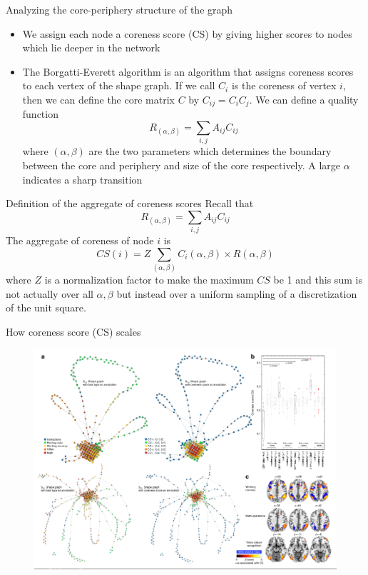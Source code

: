 \documentclass{beamer}
\begin{document}
\begin{frame}{Analyzing the core-periphery structure of the graph}
    \begin{itemize}
        \item We assign each node a coreness score (CS) by giving higher scores to nodes which lie deeper in the network
        \item The Borgatti-Everett algorithm is an algorithm that assigns coreness scores to each vertex of the shape graph. If we call $C_i$ is the coreness of vertex $i$, then we can define the core matrix $C$ by $C_{ij} = C_{i}C_j$. We can define a quality function \[R_{(\alpha,\beta)} = \sum_{i,j}A_{ij}C_{ij}\]where $(\alpha, \beta)$ are the two parameters which determines the boundary between the core and periphery and size of the core respectively. A large $\alpha$ indicates a sharp transition
    \end{itemize}
\end{frame}

\begin{frame}{Definition of the aggregate of coreness scores}
    Recall that 
    \[R_{(\alpha,\beta)} = \sum_{i,j}A_{ij}C_{ij}\]
    The aggregate of coreness of node $i$ is \[CS(i) = Z \sum_{(\alpha, \beta)} C_i(\alpha, \beta) \times R(\alpha, \beta)\]where $Z$ is a normalization factor to make the maximum $CS$ be 1 and this sum is not actually over all $\alpha,\beta$ but instead over a uniform sampling of a discretization of the unit square.
\end{frame}

\begin{frame}{How coreness score (CS) scales}
    \begin{figure}
        \includegraphics[width = 0.85\linewidth]{fig4.png}
    \end{figure}
\end{frame}
\end{document}
